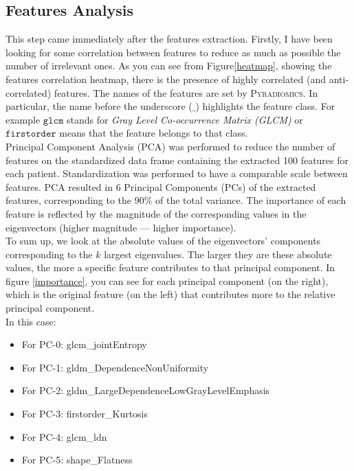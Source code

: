\documentclass{standalone}
\begin{document}
\subsection{Features Analysis}

This step came immediately after the features extraction.
Firstly, I have been looking for some correlation between features to reduce as much as possible the number of irrelevant ones.
As you can see from Figure\ref{heatmap}, showing the features correlation heatmap, there is the presence of highly correlated (and anti-correlated) features.
The names of the features are set by \textsc{Pyradiomics}. 
In particular, the name before the underscore ($\_$) highlights the feature class. 
For example $\mathtt{glcm}$ stands for \textit{Gray Level Co-occurrence Matrix (GLCM)} or $\mathtt{firstorder}$ means that the feature belongs to that class.
\\
Principal Component Analysis (PCA) was performed to reduce the number of features on the standardized data frame containing the extracted 100 features for each patient.
Standardization was performed to have a comparable scale between features.
PCA resulted in 6 Principal Components (PCs) of the extracted features, corresponding to the $90 \% $ of the total variance.
The importance of each feature is reflected by the magnitude of the corresponding values in the eigenvectors (higher magnitude — higher importance).
\\
To sum up, we look at the absolute values of the eigenvectors’ components corresponding to the $k$ largest eigenvalues. The larger they are these absolute values, the more a specific feature contributes to that principal component.
In figure \ref{importance}, you can see for each principal component (on the right), which is the original feature (on the left) that contributes more to the relative principal component.
\\
In this case: 
\begin{itemize}
    \item For PC-0: glcm\_jointEntropy
    \item For PC-1: gldm\_DependenceNonUniformity
    \item For PC-2: gldm\_LargeDependenceLowGrayLevelEmphasis
    \item For PC-3: firstorder\_Kurtosis
    \item For PC-4: glcm\_ldn
    \item For PC-5: shape\_Flatness
\end{itemize}
\end{document}
